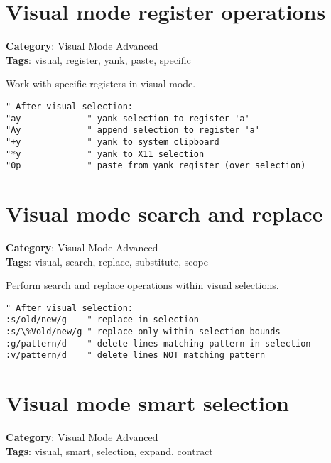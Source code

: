 {{{{{{{{{{{{{{{{{{\section{Visual mode register operations}

\textbf{Category}: Visual Mode Advanced\\ \textbf{Tags}: visual, register, yank, paste, specific
\vspace{0.5cm}

Work with specific registers in visual mode.

\begin{Exa*}{}
\begin{Verbatim}[fontsize=\footnotesize, breaklines, breakanywhere]
" After visual selection:
"ay             " yank selection to register 'a'
"Ay             " append selection to register 'a'
"+y             " yank to system clipboard
"*y             " yank to X11 selection
"0p             " paste from yank register (over selection)
\end{Verbatim}
\end{Exa*}

\section{Visual mode search and replace}

\textbf{Category}: Visual Mode Advanced\\ \textbf{Tags}: visual, search, replace, substitute, scope
\vspace{0.5cm}

Perform search and replace operations within visual selections.

\begin{Exa*}{}
\begin{Verbatim}[fontsize=\footnotesize, breaklines, breakanywhere]
" After visual selection:
:s/old/new/g    " replace in selection
:s/\%Vold/new/g " replace only within selection bounds
:g/pattern/d    " delete lines matching pattern in selection
:v/pattern/d    " delete lines NOT matching pattern
\end{Verbatim}
\end{Exa*}

\section{Visual mode smart selection}

\textbf{Category}: Visual Mode Advanced\\ \textbf{Tags}: visual, smart, selection, expand, contract
\vspace{0.5cm}

}}}}}}}}}}}}}}}}}}

